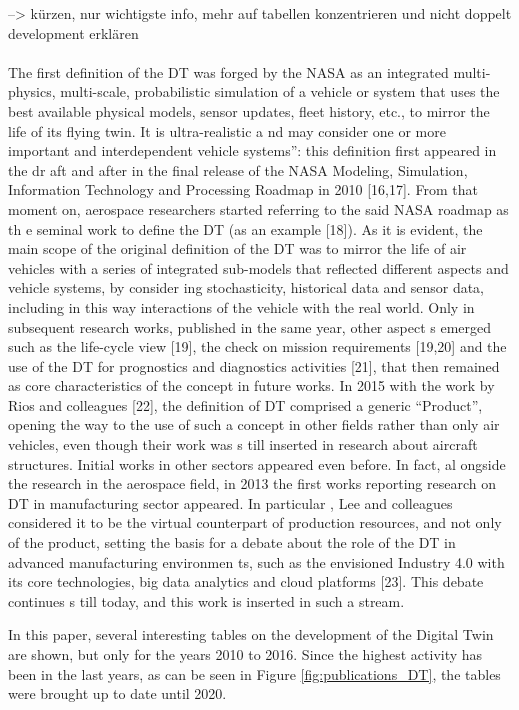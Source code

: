 --> kürzen, nur wichtigste info, mehr auf tabellen konzentrieren und nicht doppelt development erklären \\ \\

The first definition of the DT was forged by the NASA as  an integrated multi-physics, multi-scale, probabilistic simulation of a vehicle or system that uses the best available physical models, sensor updates, fleet history, etc., to mirror the life of its flying twin. It is ultra-realistic a nd may consider one or more important and interdependent vehicle systems”: this definition first appeared in the dr aft and after in the final release of the NASA Modeling, Simulation, Information Technology and Processing Roadmap in 2010 [16,17]. 
From that moment on, aerospace researchers started referring to the said NASA roadmap as th e seminal work to define the DT (as an example [18]). As it is evident, the main scope of the original definition of the DT was to mirror the life of air vehicles with a series of integrated sub-models that reflected different aspects and vehicle systems, by consider ing stochasticity, historical data and sensor data, including in this way interactions of  the vehicle with the real world. Only in subsequent research works, published in the same year, other aspect s emerged such as the life-cycle view [19], the check on mission requirements [19,20] and the use of the DT for prognostics and diagnostics activities [21], that then remained as core characteristics of the concept in future  works. 
In 2015 with the work by Rios and colleagues [22], the definition of DT comprised a generic “Product”, opening the way to the use of such a concept in other fields rather than only air vehicles, even though their work was s till inserted in research about aircraft structures. Initial works in other sectors appeared even before. 
In fact, al ongside the research in the aerospace field, in 2013 the first works reporting research on DT in manufacturing sector appeared. In particular , Lee and colleagues considered it to be the virtual counterpart of production resources, and not only of the product,  setting the basis for a debate about the role of the DT in advanced manufacturing environmen ts, such as the envisioned Industry 4.0 with its core technologies, big data analytics and cloud platforms [23]. This debate continues s till today, and this work is inserted in such a stream.

In this paper, several interesting tables on the development of the Digital Twin are shown, but only for the years 2010 to 2016. Since the highest activity has been in the last years, as can be seen in Figure \ref{fig:publications_DT}, the tables were brought up to date until 2020. 




